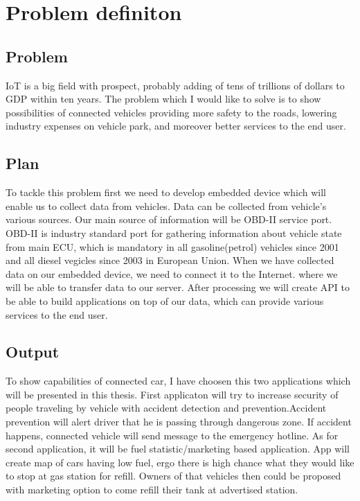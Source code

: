 \section{Problem definiton}
\subsection{Problem}
IoT is a big field with prospect, probably adding of tens of trillions of dollars to GDP within ten years. The problem which I would like to solve is to show possibilities of connected vehicles providing more safety to the roads, lowering industry expenses on vehicle park, and moreover better services to the end user.
\subsection{Plan}
To tackle this problem first we need to develop embedded device which will enable us to collect data from vehicles. Data can be collected from vehicle's various sources. Our main source of information will be OBD-II service port. OBD-II is industry standard port for gathering information about vehicle state from main ECU, which is mandatory in all gasoline(petrol) vehicles since 2001 and all diesel vegicles since 2003 in European Union. When we have collected data on our embedded device, we need to connect it to the Internet. where we will be able to transfer data to our server. After processing we will create API to be able to build applications on top of our data, which can provide various services to the end user.\\
\subsection{Output}
To show capabilities of connected car, I have choosen this two applications which will be presented in this thesis. First applicaton will try to increase security of people traveling by vehicle with accident detection and prevention.Accident prevention will alert driver that he is passing through dangerous zone. If accident happens, connected vehicle will send message to the emergency hotline. As for second application, it will be fuel statistic/marketing based application. App will create map of cars having low fuel, ergo there is high chance what they would like to stop at gas station for refill. Owners of that vehicles then could be proposed with marketing option to come refill their tank at advertised station. 

